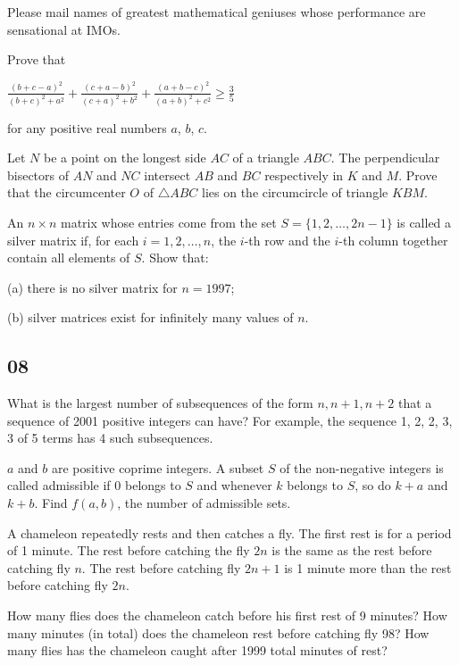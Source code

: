 \bq{}{}
Please mail names of greatest mathematical geniuses whose performance are sensational at IMOs.
\eq

Prove that

$ \frac{\left(b+c-a\right)^{2}}{\left(b+c\right)^{2}+a^{2}}+\frac{\left(c+a-b\right)^{2}}{\left(c+a\right)^{2}+b^{2}}+\frac{\left(a+b-c\right)^{2}}{\left(a+b\right)^{2}+c^{2}}\geq\frac35$

for any positive real numbers $ a$, $ b$, $ c$.
\eq

\bq{}{}
Let $N$ be a point on the longest side $AC$ of a triangle $ABC$. The perpendicular bisectors of $AN$ and $NC$ intersect $AB$ and $BC$ respectively in $K$ and $M$. Prove that the circumcenter $O$ of $\triangle ABC$ lies on the circumcircle of triangle $KBM$.
\eq

An $ n \times n$ matrix whose entries come from the set $ S = \{1, 2, \ldots , 2n - 1\}$ is called a silver matrix if, for each $ i = 1, 2, \ldots , n$, the $ i$-th row and the $ i$-th column together contain all elements of $ S$. Show that:

(a) there is no silver matrix for $ n = 1997$;

(b) silver matrices exist for infinitely many values of $ n$.
\eq

\newpage
\subsection{08}
What is the largest number of subsequences of the form $n, n+1, n+2$ that a sequence of 2001 positive integers can have? For example, the sequence {1, 2, 2, 3, 3} of 5 terms has 4 such subsequences.
\eq

\bq{}{}
$a$ and $b$ are positive coprime integers. A subset $S$ of the non-negative integers is called admissible if $0$ belongs to $S$ and whenever $k$ belongs to $S$, so do $k + a$ and $k + b$. Find $f(a, b)$, the number of admissible sets.
\eq

A chameleon repeatedly rests and then catches a fly. The first rest is for a period of 1 minute. The rest before catching the fly $2n$ is the same as the rest before catching fly $n$. The rest before catching fly $2n+1$ is 1 minute more than the rest before catching fly $2n$.

How many flies does the chameleon catch before his first rest of 9 minutes?
How many minutes (in total) does the chameleon rest before catching fly 98?
How many flies has the chameleon caught after 1999 total minutes of rest?
\eq

